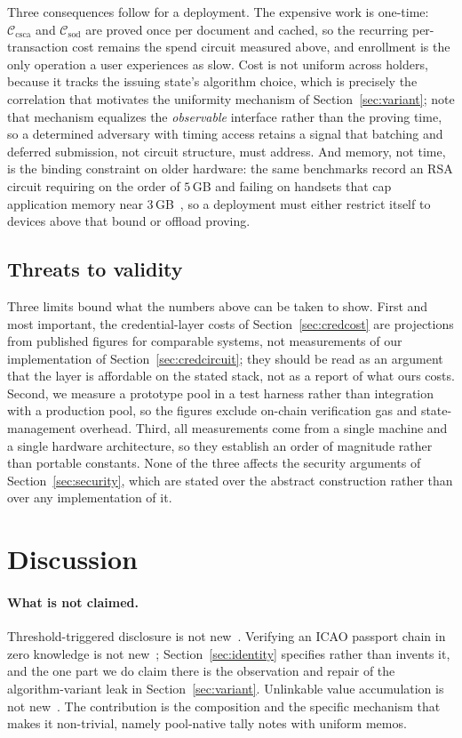 \documentclass[11pt,a4paper]{article}
\theoremstyle{definition}
\theoremstyle{plain}
\theoremstyle{remark}
\begin{document}
Three consequences follow for a deployment. The expensive work is one-time: $\mathcal{C}_{\mathrm{csca}}$ and $\mathcal{C}_{\mathrm{sod}}$ are proved once per document and cached, so the recurring per-transaction cost remains the spend circuit measured above, and enrollment is the only operation a user experiences as slow. Cost is not uniform across holders, because it tracks the issuing state's algorithm choice, which is precisely the correlation that motivates the uniformity mechanism of Section~\ref{sec:variant}; note that mechanism equalizes the \emph{observable} interface rather than the proving time, so a determined adversary with timing access retains a signal that batching and deferred submission, not circuit structure, must address. And memory, not time, is the binding constraint on older hardware: the same benchmarks record an RSA circuit requiring on the order of $5$\,GB and failing on handsets that cap application memory near $3$\,GB~\cite{mopro}, so a deployment must either restrict itself to devices above that bound or offload proving.

\subsection{Threats to validity}

Three limits bound what the numbers above can be taken to show. First and most important, the credential-layer costs of Section~\ref{sec:credcost} are projections from published figures for comparable systems, not measurements of our implementation of Section~\ref{sec:credcircuit}; they should be read as an argument that the layer is affordable on the stated stack, not as a report of what ours costs. Second, we measure a prototype pool in a test harness rather than integration with a production pool, so the figures exclude on-chain verification gas and state-management overhead. Third, all measurements come from a single machine and a single hardware architecture, so they establish an order of magnitude rather than portable constants. None of the three affects the security arguments of Section~\ref{sec:security}, which are stated over the abstract construction rather than over any implementation of it.

\section{Discussion}
\label{sec:discussion}

\paragraph{What is not claimed.}
Threshold-triggered disclosure is not new~\cite{chl2006,ggm16,prcash,cap}. Verifying an ICAO passport chain in zero knowledge is not new~\cite{zkcreds,zkpassport}; Section~\ref{sec:identity} specifies rather than invents it, and the one part we do claim there is the observation and repair of the algorithm-variant leak in Section~\ref{sec:variant}. Unlinkable value accumulation is not new~\cite{bbaplus,uacs}. The contribution is the composition and the specific mechanism that makes it non-trivial, namely pool-native tally notes with uniform memos.
\end{document}
